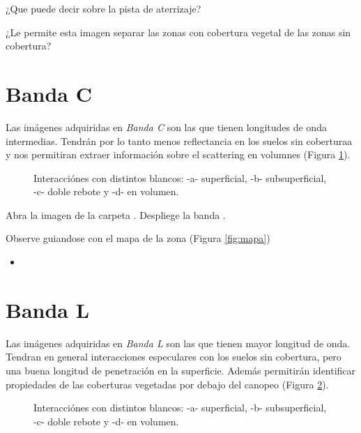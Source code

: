 \begin{que}
    ¿Que puede decir sobre la pista de aterrizaje?
\end{que}

\begin{que}
    ¿Le permite esta imagen separar las zonas con cobertura vegetal de las zonas sin cobertura?
\end{que}

\section{Banda C}

Las imágenes adquiridas en \emph{Banda C} son las que tienen longitudes de onda intermedias. Tendrán por lo tanto menos reflectancia en los suelos sin coberturaa y nos permitiran extraer información sobre el scattering en volumnes (Figura \ref{fig:bandaC}).

\begin{figure}[h!]
    \centering
    \caption{Interacciónes con distintos blancos: -a- superficial, -b- subsuperficial, -c- doble rebote y -d- en volumen.}
    \label{fig:bandaC}
\end{figure}

Abra la imagen  de la carpeta . Despliege la banda .

Observe guiandose con el mapa de la zona (Figura \ref{fig:mapa})
\begin{itemize}
    \item
\end{itemize}

\section{Banda L}

Las imágenes adquiridas en \emph{Banda L} son las que tienen mayor longitud de onda. Tendran en general interacciones especulares con los suelos sin cobertura, pero una buena longitud de penetración en la superficie. Además permitirán identificar propiedades de las coberturas vegetadas por debajo del canopeo (Figura \ref{fig:bandaL}).

\begin{figure}[h!]
    \centering
    \caption{Interacciónes con distintos blancos: -a- superficial, -b- subsuperficial, -c- doble rebote y -d- en volumen.}
    \label{fig:bandaL}
\end{figure}

